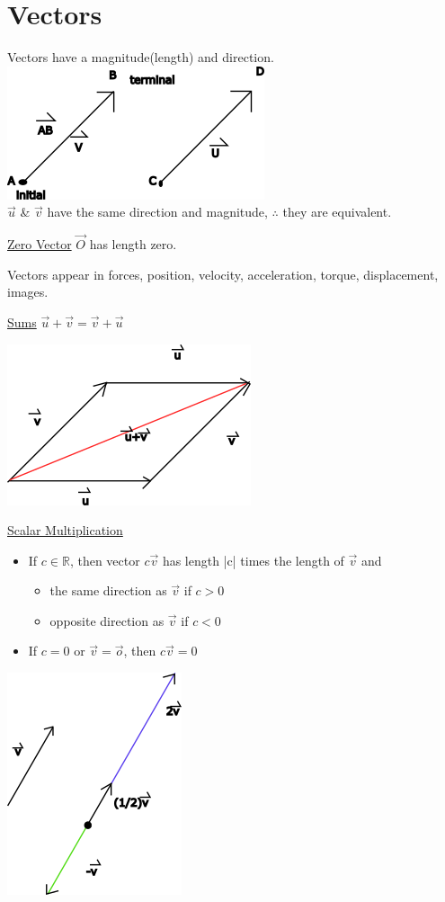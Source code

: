 \documentclass[10pt]{article}
\begin{document}
\section{Vectors}
Vectors have a magnitude(length) and direction.\\
\includegraphics{somevectors}\\ $\vec{u}$ \& $\vec{v}$ have the same direction and magnitude, $\therefore$ they are equivalent.

\underline{Zero Vector} $\vec{O}$ has length zero. 

Vectors appear in forces, position, velocity, acceleration, torque, displacement, images.

\underline{Sums} $\vec{u}+\vec{v} = \vec{v}+\vec{u}$ 
 
\includegraphics{sumvector} 
 
\underline{Scalar Multiplication}
\begin{itemize}
	\item If $c\in\mathbb{R}$, then vector $c \vec{v}$ has length |c| times the length of $\vec{v}$ and \begin{itemize} 
		\item the same direction as $\vec{v}$ if $c > 0$ 
		\item opposite direction as $\vec{v}$ if $c < 0$ 
	\end{itemize}
	\item If $c=0$ or $\vec{v} = \vec{o}$, then $c \vec{v} = 0$ 
\end{itemize}

\includegraphics{scalarmult}
\end{document}
